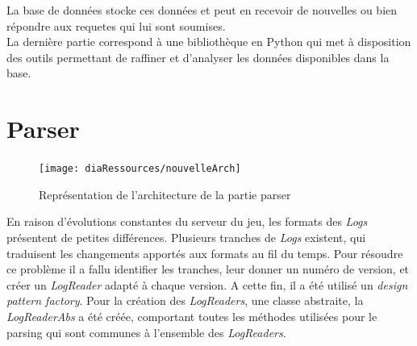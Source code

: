 La base de données stocke ces données et peut en recevoir de nouvelles ou bien répondre aux requetes qui lui sont soumises.\\

La dernière partie correspond à une bibliothèque en Python qui met à disposition des outils permettant de raffiner et d'analyser les données disponibles dans la base. \\


\section{Parser}
\begin{figure}[!h]
  \begin{center}
    \texttt{[image: diaRessources/nouvelleArch]}
  \end{center}
  \caption{Représentation de l'architecture de la partie parser}
\end{figure}
En raison d'évolutions constantes du serveur du jeu, les formats des \textit{Logs} présentent de petites différences. Plusieurs tranches de \textit{Logs} existent, qui traduisent les changements apportés aux formats au fil du temps. 
Pour résoudre ce problème il a fallu identifier les tranches, leur donner un numéro de version, et créer un \textit{LogReader} adapté à chaque version. A cette fin, il a été utilisé un \textit{design pattern factory}.
Pour la création des \textit{LogReaders}, une classe abstraite, la \textit{LogReaderAbs} a été créée, comportant toutes les méthodes utilisées pour le parsing qui sont communes à l'ensemble des \textit{LogReaders}. 

